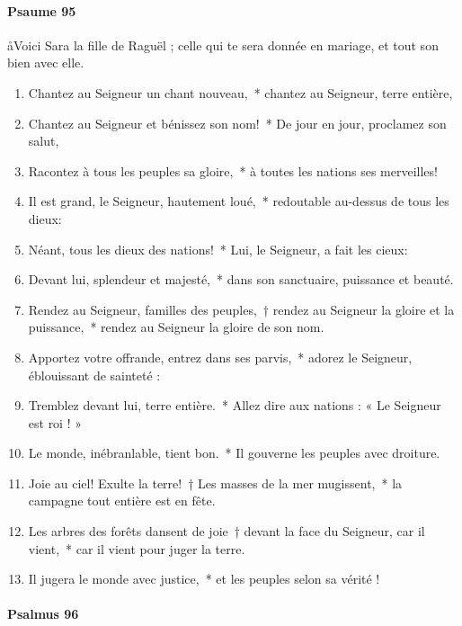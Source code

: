 \documentclass[twoside]{article}
\begin{document}
\begin{paracol}[1]{2}
\switchcolumn

\paragraph{Psaume 95}
\aa Voici Sara la fille de Raguël ; celle qui te sera donnée en mariage, et tout son bien avec elle.


\begin{enumerate}[wide, itemsep=0mm, labelwidth=!, labelindent=0pt, label=\color{gregoriocolor}\theenumi]
\item Chantez au Seigneur un chant nouveau,~* chantez au Seigneur, terre entière,
\item Chantez au Seigneur et bénissez son nom!~* De jour en jour, proclamez son salut,
\item Racontez à tous les peuples sa gloire,~* à toutes les nations ses merveilles!
\item Il est grand, le Seigneur, hautement loué,~* redoutable au-dessus de tous les dieux:
\item Néant, tous les dieux des nations!~* Lui, le Seigneur, a fait les cieux:
\item Devant lui, splendeur et majesté,~* dans son sanctuaire, puissance et beauté.
\item Rendez au Seigneur, familles des peuples,~† rendez au Seigneur la gloire et la puissance,~* rendez au Seigneur la gloire de son nom.
\item Apportez votre offrande, entrez dans ses parvis,~* adorez le Seigneur, éblouissant de sainteté : 
\item Tremblez devant lui, terre entière.~* Allez dire aux nations : « Le Seigneur est roi ! » 
\item Le monde, inébranlable, tient bon.~* Il gouverne les peuples avec droiture.
\item Joie au ciel! Exulte la terre!~† Les masses de la mer mugissent,~* la campagne tout entière est en fête. 
\item Les arbres des forêts dansent de joie~† devant la face du Seigneur, car il vient,~* car il vient pour juger la terre.
\item Il jugera le monde avec justice,~* et les peuples selon sa vérité !
\end{enumerate}
\pagebreak
\switchcolumn*

\paragraph{Psalmus 96}


\end{paracol}
\end{document}
